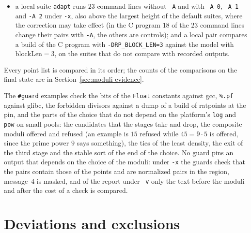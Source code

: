 \begin{itemize}
    run at $16383$ with \verb|-t 4| under \verb|-x| is in the suite \verb|threads|;
  \item a local suite \verb|adapt| runs $23$ command lines without \verb|-A| and with \verb|-A 0|,
    \verb|-A 1| and \verb|-A 2| under \verb|-x|, also above the largest height of the default
    suites, where the correction may take effect (in the C program $18$ of the $23$ command lines
    change their pairs with \verb|-A|, the others are controls); and a local pair compares a build
    of the C program with \verb|-DRP_BLOCK_LEN=3| against the model with $\mathrm{blockLen} = 3$, on
    the suites that do not compare with recorded outputs.
\end{itemize}
Every point list is compared in its order; the counts of the comparisons on the final state are in
Section~\ref{sec:moduli-evidence}.

The \verb|#guard| examples check the bits of the \verb|Float| constants against gcc, \verb|%.pf|
against glibc, the forbidden divisors against a dump of a build of ratpoints at the pin, and the
parts of the choice that do not depend on the platform's \verb|log| and \verb|pow| on small pools:
the candidates that the stages take and drop, the composite moduli offered and refused (an example
is $15$ refused while $45 = 9 \cdot 5$ is offered, since the prime power $9$ says something), the
ties of the least density, the exit of the third stage and the stable sort of the end of the choice.
No guard pins an output that depends on the choice of the moduli: under \verb|-x| the guards check
that the pairs contain those of the points and are normalized pairs in the region, message~4 is
masked, and of the report under \verb|-v| only the text before the moduli and after the cost of a
check is compared.

\section{Deviations and exclusions}\label{sec:moduliDeviations}

